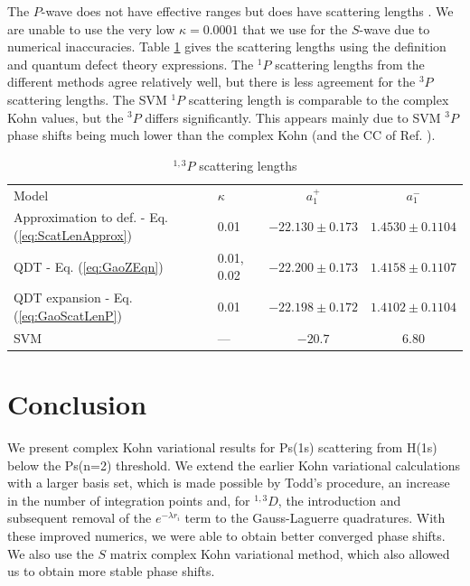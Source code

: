 \documentclass[preprint,showpacs,showkeys,preprintnumbers,amsmath,amssymb,longbibliography,pra,aps]{revtex4-1}
\begin{document}
The $P$-wave does not have effective ranges but does have scattering lengths 
\cite{Levy1963}. We are unable to use the very low $\kappa = 0.0001$ that we 
use for the $S$-wave due to numerical inaccuracies. Table \ref{tab:PWaveScatLen}
 gives the scattering lengths using the definition and quantum defect theory 
expressions. The $^1P$ scattering lengths from the different methods agree 
relatively well, but there is less agreement for the $^3P$ scattering 
lengths. The SVM \cite{Ivanov2002} $^1P$ scattering length is comparable to 
the complex Kohn values, but the $^3P$ differs significantly. This appears 
mainly due to SVM $^3P$ phase shifts being much lower than the complex Kohn
(and the CC of Ref. \cite{Blackwood2002}).

\begin{table}[H]
\begin{center}
\begin{ruledtabular}
\begin{tabular}{l l c c}
Model & $\kappa$ & $a_1^+$ & $a_1^-$ \\
\colrule
Approximation to def. - Eq. (\ref{eq:ScatLenApprox}) & 0.01 & $-22.130 \pm 0.173$ & $1.4530 \pm 0.1104$ \\
QDT - Eq. (\ref{eq:GaoZEqn}) & 0.01, 0.02 & $-22.200 \pm 0.173$ & $1.4158 \pm 0.1107$ \\
QDT expansion - Eq. (\ref{eq:GaoScatLenP}) & 0.01 & $-22.198 \pm 0.172$ & $1.4102 \pm 0.1104$ \\
\colrule
SVM \cite{Ivanov2002} & --- & $-20.7$ & $6.80$ 
\end{tabular}
\end{ruledtabular}
\caption{$^{1,3}P$ scattering lengths}
\label{tab:PWaveScatLen}
\end{center}
\end{table}


\section{Conclusion}

We present complex Kohn variational results for Ps(1s) scattering from H(1s) 
below the Ps(n=2) threshold. We extend the earlier Kohn variational 
calculations \cite{VanReeth2003,VanReeth2004} with a larger basis set, which 
is made possible by Todd's procedure,
an increase in the number of integration points and, for
$^{1,3}D$, the introduction and subsequent removal of the $e^{-\lambda r_i}$
term to the Gauss-Laguerre quadratures. With these improved numerics, we were
able to obtain better converged phase shifts.
We also use the $S$ matrix complex Kohn variational method, which also allowed
us to obtain more stable phase shifts.
\end{document}
